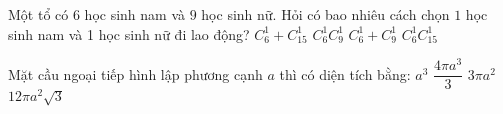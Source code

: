 \begin{ex}%
Một tổ có $6$ học sinh nam và $9$ học sinh nữ. Hỏi có bao nhiêu cách chọn $1$ học sinh nam và 1 học sinh nữ đi lao động?
\choice
{$C_6^1+C_{15}^1$}
{\True $C_6^1 C_9^1$}
{$C_6^1+C_9^1$}
{$C_6^1 C_{15}^1$}

\end{ex}

\begin{ex}%
Mặt cầu ngoại tiếp hình lập phương cạnh $a$ thì có diện tích bằng:
\choice
{$a^3$}
{$\dfrac{4\pi a^3}{3}$}
{\True $3\pi a^2$}
{$12\pi a^2 \sqrt{3}$}

\end{ex}

